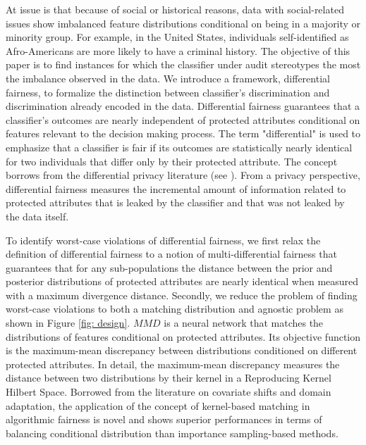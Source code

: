 \documentclass{article}
\begin{document}
\bigskip
 At issue is that because of social or historical reasons, data with social-related issues show imbalanced feature distributions conditional on being in a majority or minority group. For example, in the United States, individuals self-identified as Afro-Americans are more likely to have a criminal history. The objective of this paper is to find instances for which the classifier under audit stereotypes the most the imbalance observed in the data. We introduce a framework, differential fairness, to formalize the distinction between classifier's discrimination and discrimination already encoded in the data. Differential fairness guarantees that a classifier's outcomes are nearly independent of protected attributes conditional on features relevant to the decision making process. The term "differential" is used to emphasize that a classifier is fair if its outcomes are statistically nearly identical for two individuals that differ only by their protected attribute.  The concept borrows from the differential privacy literature (see \cite{dwork2014algorithmic}). From a privacy perspective, differential fairness  measures the incremental amount of information related to protected attributes that is leaked by the classifier and that was not leaked by the data itself. 
 
 \bigskip
 To identify worst-case violations of differential fairness, we first relax the definition of differential fairness to a notion of multi-differential fairness that guarantees that for any sub-populations the distance between the prior and posterior distributions of protected attributes are nearly identical when measured with a maximum divergence distance. Secondly, we reduce the problem of finding worst-case violations to both a matching distribution and agnostic problem as shown in Figure \ref{fig: design}. $MMD$ is a neural network that matches the distributions of features conditional on protected attributes. Its objective function is the maximum-mean discrepancy between distributions conditioned on different protected attributes. In detail, the maximum-mean discrepancy measures the distance between two distributions by their kernel in a Reproducing Kernel Hilbert Space. Borrowed from the literature on covariate shifts and domain adaptation, the application of the concept of kernel-based matching in algorithmic fairness is novel and shows superior performances in terms of balancing conditional distribution than importance sampling-based methods. 
 
\end{document}
